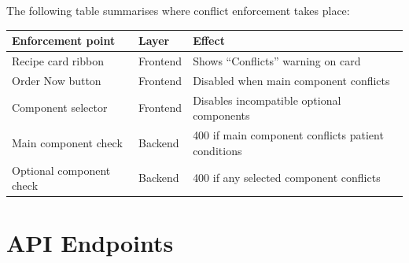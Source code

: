\documentclass[12pt,a4paper]{article}
\begin{document}
The following table summarises where conflict enforcement takes place:

\begin{center}
\begin{tabular}{lll}
\toprule
\textbf{Enforcement point} & \textbf{Layer} & \textbf{Effect} \\
\midrule
Recipe card ribbon          & Frontend & Shows ``Conflicts'' warning on card \\
Order Now button            & Frontend & Disabled when main component conflicts \\
Component selector          & Frontend & Disables incompatible optional components \\
Main component check        & Backend  & 400 if main component conflicts patient conditions \\
Optional component check    & Backend  & 400 if any selected component conflicts \\
\bottomrule
\end{tabular}
\end{center}

\section{API Endpoints}
\end{document}
